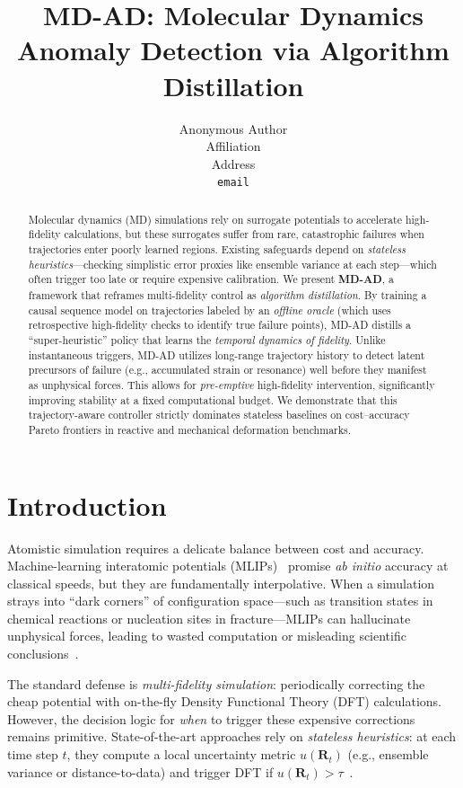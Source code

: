 \documentclass{article}
\title{MD-AD: Molecular Dynamics Anomaly Detection via Algorithm Distillation}
\author{%
  Anonymous Author \\
  Affiliation \\
  Address \\
  \texttt{email} \\
}
\date{}
\begin{document}
\maketitle

\begin{abstract}
Molecular dynamics (MD) simulations rely on surrogate potentials to accelerate high-fidelity calculations, but these surrogates suffer from rare, catastrophic failures when trajectories enter poorly learned regions. Existing safeguards depend on \emph{stateless heuristics}—checking simplistic error proxies like ensemble variance at each step—which often trigger too late or require expensive calibration. We present \textbf{MD-AD}, a framework that reframes multi-fidelity control as \emph{algorithm distillation}. By training a causal sequence model on trajectories labeled by an \emph{offline oracle} (which uses retrospective high-fidelity checks to identify true failure points), MD-AD distills a ``super-heuristic'' policy that learns the \emph{temporal dynamics of fidelity}. Unlike instantaneous triggers, MD-AD utilizes long-range trajectory history to detect latent precursors of failure (e.g., accumulated strain or resonance) well before they manifest as unphysical forces. This allows for \emph{pre-emptive} high-fidelity intervention, significantly improving stability at a fixed computational budget. We demonstrate that this trajectory-aware controller strictly dominates stateless baselines on cost--accuracy Pareto frontiers in reactive and mechanical deformation benchmarks.
\end{abstract}

\section{Introduction}
\label{sec:intro}

Atomistic simulation requires a delicate balance between cost and accuracy. Machine-learning interatomic potentials (MLIPs)~\cite{schutt2017schnet,batzner2022nequip} promise \emph{ab initio} accuracy at classical speeds, but they are fundamentally interpolative. When a simulation strays into ``dark corners'' of configuration space—such as transition states in chemical reactions or nucleation sites in fracture—MLIPs can hallucinate unphysical forces, leading to wasted computation or misleading scientific conclusions~\cite{fu2022forcesnot}.

The standard defense is \emph{multi-fidelity simulation}: periodically correcting the cheap potential with on-the-fly Density Functional Theory (DFT) calculations. However, the decision logic for \emph{when} to trigger these expensive corrections remains primitive. State-of-the-art approaches rely on \emph{stateless heuristics}: at each time step $t$, they compute a local uncertainty metric $u(\mathbf{R}_t)$ (e.g., ensemble variance or distance-to-data) and trigger DFT if $u(\mathbf{R}_t) > \tau$~\cite{active_learning_refs}.
\end{document}
